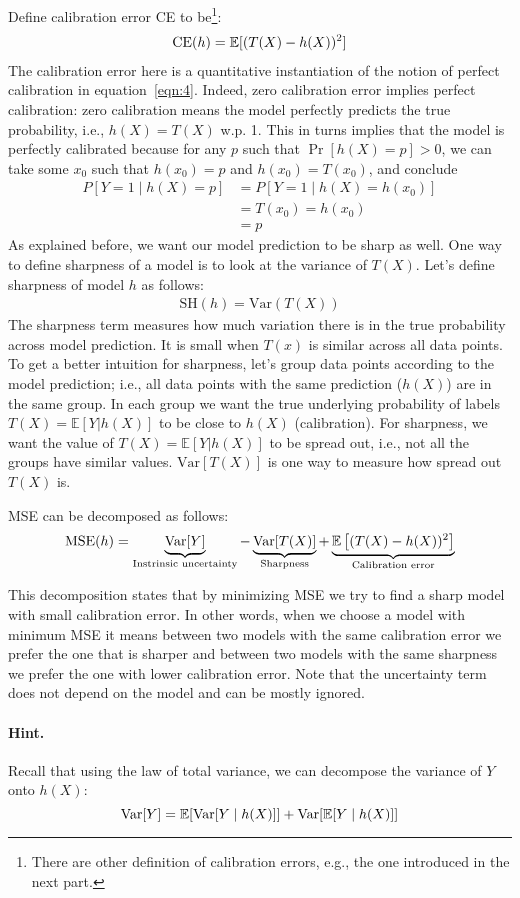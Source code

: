 Define calibration error CE to be\footnote{There are other definition of calibration errors, e.g., the one introduced in the next part.}:
\begin{align}
	\text{CE}(h) = \mathbb{E} [(T(X) - h(X))^2]
\end{align}
The calibration error here is a quantitative instantiation of the notion of perfect calibration in equation~\eqref{eqn:4}.  Indeed,  zero calibration error implies perfect calibration: zero calibration means the model perfectly predicts the true probability, i.e., $h(X) = T(X)$ w.p. 1. This in turns implies that the model is perfectly calibrated because for any $p$ such that $\Pr[h(X)=p] > 0$, we can take some $x_0$ such that $h(x_0) = p$ and $h(x_0)=T(x_0)$, and conclude
\begin{align}
P[Y=1\mid h(X)= p] & = P[Y=1\mid h(X)= h(x_0)] \\
& = T(x_0) = h(x_0) \tag{by calibration error = 0} \\
& = p \tag{by the assumption that $h(x_0)= p$}
\end{align}
As explained before, we want our model prediction to be sharp as well. 
One way to define sharpness of a model is to look at the variance of $T(X)$. 
Let's define sharpness of model $h$ as follows:
\begin{align}
\text {SH}(h) = \text {Var} (T(X))
\end{align}
The sharpness term measures how much variation there is in the true probability across model prediction.
It is small when $T(x)$ is similar across all data points. To get a better intuition for sharpness, let's group data points according to the model prediction; i.e., all data points with the same prediction ($h(X)$) are in the same group. 
In each group we want the true underlying probability of labels $T(X)=\mathbb{E}[Y | h(X)]$ to be close to $h(X)$ (calibration). 
For sharpness, we want the value of $T(X) = \mathbb{E} [Y | h(X)]$ to be spread out, i.e., not all the groups have similar values. 
$\text {Var} [T(X)]$ is one way to measure how spread out $T(X)$ is.

MSE can be decomposed as follows:
\begin{align}
	\label{eqn:mse-decomposiiton}
	\text {MSE}(h) = \underbrace{\text {Var}[Y]}_{\text {Instrinsic uncertainty}} - \underbrace{\text {Var} [T(X)]}_\text{Sharpness} + \underbrace{\mathbb{E} \left [(T(X) - h(X))^2\right]}_\text{Calibration error}
\end{align}

This decomposition states that by minimizing MSE we try to find a sharp model with small calibration error.
In other words, when we choose a model with minimum MSE it means between two models with the same calibration error we prefer the one that is sharper and between two models with the same sharpness we prefer the one with lower calibration error.
Note that the uncertainty term does not depend on the model and can be mostly ignored.


\paragraph{Hint.}
Recall that using the law of total variance, we can decompose the variance of $Y$ onto $h(X)$:
$$	\text {Var}[Y] = \mathbb{E} [\text {Var}[Y \mid h(X)]] + \text {Var} [\mathbb{E} [Y \mid h(X)]]$$
